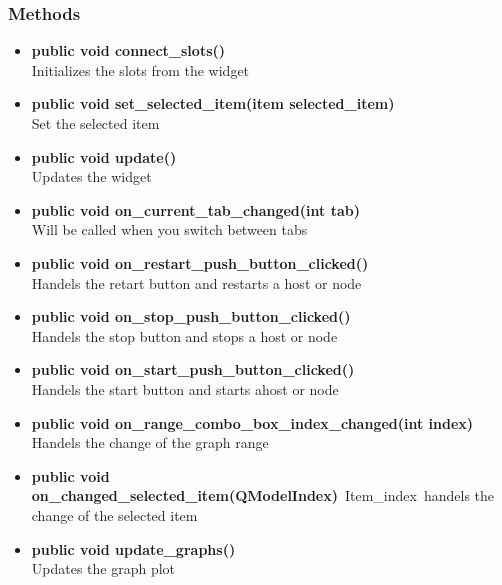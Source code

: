 \subsubsection{Methods}
\begin{itemize}
  \item \textbf{public void connect\_slots()}\\
  Initializes the slots from the widget
  \item \textbf{public void set\_selected\_item(item selected\_item)}\\
  Set the selected item
  \item \textbf{public void update()}\\
  Updates the widget
  \item \textbf{public void on\_current\_tab\_changed(int tab)}\\
  Will be called when you switch between tabs
  \item \textbf{public void on\_restart\_push\_button\_clicked()}\\
  Handels the retart button and restarts a host or node
  \item \textbf{public void on\_stop\_push\_button\_clicked()}\\
  Handels the stop button and stops a host or node
  \item \textbf{public void on\_start\_push\_button\_clicked()}\\
  Handels the start button and starts ahost or node
  \item \textbf{public void on\_range\_combo\_box\_index\_changed(int index)}\\
  Handels the change of the graph range
  \item \textbf{public void on\_changed\_selected\_item(QModelIndex)}\
  Item\_index\ handels the change of the selected item
  \item \textbf{public void update\_graphs()}\\
  Updates the graph plot
\end{itemize}